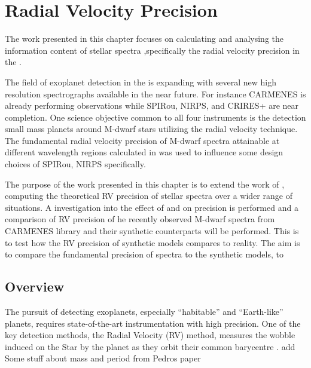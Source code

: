 
\chapter{Radial Velocity Precision}
\label{cha:nir_content}

The work presented in this chapter focuses on calculating and analysing the information content of stellar spectra ,specifically the radial velocity precision in the \nir{}.  

The field of exoplanet detection in the \nir{} is expanding with several new high resolution \nir{} spectrographs available in the near future. For instance {CARMENES} is already performing observations while SPIRou, {NIRPS}, and CRIRES+ are near completion. One science objective common to all four instruments is the detection small mass planets around {M-dwarf} stars utilizing the radial velocity technique. 
The fundamental radial velocity precision of {M-dwarf} spectra attainable at different wavelength regions calculated in \citet{figueira_radial_2016} was used to influence some design choices of SPIRou, {NIRPS} specifically. 

The purpose of the work presented in this chapter is to extend the work of \citet{figueira_radial_2016}, computing the theoretical RV precision of stellar spectra over a wider range of situations. A investigation into the effect of \logg{} and \feh{} on precision is performed and a comparison of RV precision of he recently observed \nir{} {M-dwarf} spectra from {CARMENES} library and their synthetic counterparts will be performed. This is to test how the {RV} precision of synthetic models compares to reality.
The aim is to compare the fundamental precision of \nir{} spectra to the synthetic models, to 


\section{Overview}

The pursuit of detecting exoplanets, especially ``habitable'' and ``Earth-like'' planets, requires state-of-the-art instrumentation with high precision. One of the key detection methods, the Radial Velocity ({RV}) method, measures the wobble induced on the Star by the planet as they orbit their common barycentre .  {\red{} add Some stuff about mass and period from Pedros paper}  




